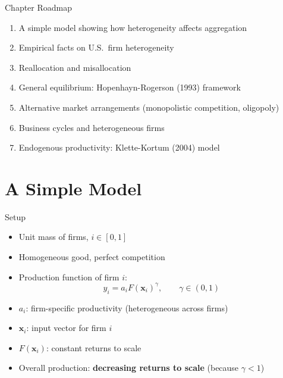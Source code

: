 \documentclass[blue]{beamer}
\begin{document}
\begin{frame}{Chapter Roadmap}
	\begin{enumerate}
		\item A simple model showing how heterogeneity affects aggregation
		\item Empirical facts on U.S.\ firm heterogeneity
		\item Reallocation and misallocation
		\item General equilibrium: Hopenhayn-Rogerson (1993) framework
		\item Alternative market arrangements (monopolistic competition, oligopoly)
		\item Business cycles and heterogeneous firms
		\item Endogenous productivity: Klette-Kortum (2004) model
	\end{enumerate}
\end{frame}

\section{A Simple Model}

\begin{frame}{Setup}
	\begin{itemize}
		\item Unit mass of firms, $i \in [0,1]$
		\item Homogeneous good, perfect competition
		\item Production function of firm $i$:
		\[
		y_i = a_i F(\mathbf{x}_i)^\gamma, \qquad \gamma \in (0,1)
		\]
		\item $a_i$: firm-specific productivity (heterogeneous across firms)
		\item $\mathbf{x}_i$: input vector for firm $i$
		\item $F(\mathbf{x}_i)$: constant returns to scale
		\item Overall production: \textbf{decreasing returns to scale} (because $\gamma < 1$)
	\end{itemize}
\end{frame}
\end{document}
